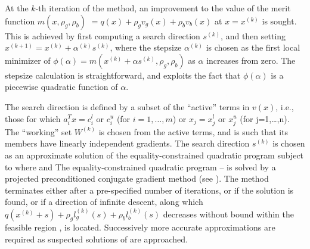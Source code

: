 \documentclass[twoside]{article}
\begin{document}
At the $k$-th iteration of the method, an improvement to the value
of the merit function 
$m(x, \rho_g, \rho_b )$ $= q(x) + \rho_g v_g(x) + \rho_b v_b(x)$
at $x = x^{(k)}$ is sought. This is achieved by first 
computing a search direction $s^{(k)}$,
and then setting $x^{(k+1)} = x^{(k)} + \alpha^{(k)} s^{(k)}$,
where the stepsize $\alpha^{(k)}$ is chosen as the first local minimizer of 
$\phi ( \alpha ) = m( x^{(k)} + \alpha s^{(k)} , \rho_g, \rho_b )$
as $\alpha$ increases from zero. 
The stepsize calculation is straightforward, and exploits the fact that
$\phi ( \alpha )$ is a piecewise quadratic function of $\alpha$.

The search direction is defined by a subset of the ``active'' terms in 
$v(x)$, i.e., those for which 
$a_i^T x = c_i^l$ or $c_i^u$ (for $i=1,\ldots ,m$) or 
$x_j = x_j^l$ or $x_j^u$ (for {j=1,\ldots ,n}).
The ``working'' set $W^{(k)}$ is chosen from the active terms, and is such 
that its members have linearly independent gradients. 
The search direction $s^{(k)}$ is chosen as an approximate solution of 
the equality-constrained quadratic program
subject to 
where
and
The equality-constrained quadratic program -- is solved by
a projected preconditioned conjugate gradient 
method (see ). The method terminates
either after a pre-specified number of iterations, or if the solution is found,
or if a direction of infinite descent, along which 
$q(x^{(k)} + s) + \rho_g l_g^{(k)} (s) + \rho_b l_b^{(k)} (s)$
decreases without bound within the feasible region , is located. 
Successively more accurate approximations are required as suspected 
solutions of  are approached.
\end{document}
